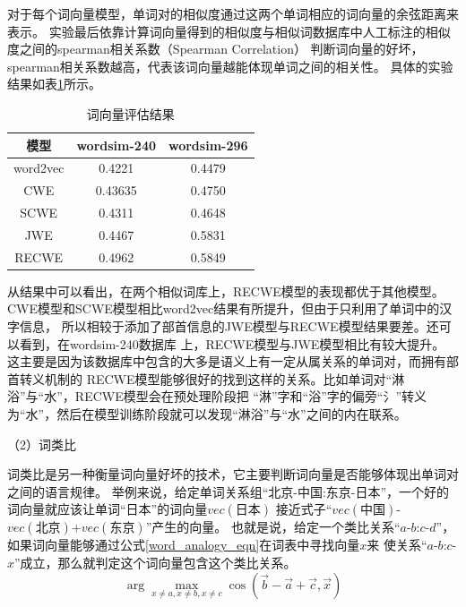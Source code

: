 对于每个词向量模型，单词对的相似度通过这两个单词相应的词向量的余弦距离来表示。
实验最后依靠计算词向量得到的相似度与相似词数据库中人工标注的相似度之间的spearman相关系数（Spearman Correlation）
判断词向量的好坏，spearman相关系数越高，代表该词向量越能体现单词之间的相关性。
具体的实验结果如表\ref{word_vec_result}所示。
\begin{table}[ht]
    \caption{词向量评估结果}
    \begin{tabular}{|c|c|c|}
        \hline
        模型 & wordsim-240 & wordsim-296 \\
        \hline
        word2vec & 0.4221 & 0.4479 \\
        \hline
        CWE & 0.43635 & 0.4750 \\
        \hline
        SCWE & 0.4311 & 0.4648 \\
        \hline
        JWE & 0.4467 & 0.5831 \\
        \hline
        RECWE & 0.4962 & 0.5849 \\
        \hline
    \end{tabular}
    \label{word_vec_result}
    \end{table}

从结果中可以看出，在两个相似词库上，RECWE模型的表现都优于其他模型。
CWE模型和SCWE模型相比word2vec结果有所提升，但由于只利用了单词中的汉字信息，
所以相较于添加了部首信息的JWE模型与RECWE模型结果要差。还可以看到，在wordsim-240数据库
上，RECWE模型与JWE模型相比有较大提升。
这主要是因为该数据库中包含的大多是语义上有一定从属关系的单词对，而拥有部首转义机制的
RECWE模型能够很好的找到这样的关系。比如单词对“淋浴”与“水”，RECWE模型会在预处理阶段把
“淋”字和“浴”字的偏旁“氵”转义为“水”，然后在模型训练阶段就可以发现“淋浴”与“水”之间的内在联系。

（2）词类比

词类比是另一种衡量词向量好坏的技术，它主要判断词向量是否能够体现出单词对之间的语言规律。
举例来说，给定单词关系组“北京-中国:东京-日本”，一个好的词向量就应该让单词“日本”的词向量$vec\left(\mbox{日本}\right)$
接近式子“$vec\left(\mbox{中国}\right)$-$vec\left(\mbox{北京}\right)$+$vec\left(\mbox{东京}\right)$”产生的向量。
也就是说，给定一个类比关系“$a$-$b$:$c$-$d$”，如果词向量能够通过公式\ref{word_analogy_eqn}在词表中寻找向量$x$来
使关系“$a$-$b$:$c$-$x$”成立，那么就判定这个词向量包含这个类比关系。
\begin{equation}
    \arg \max_{x\neq a,x\neq b,x\neq c}\cos \left ( \vec{b}-\vec{a}+\vec{c},\vec{x} \right )
    \label{word_analogy_eqn}
\end{equation}

